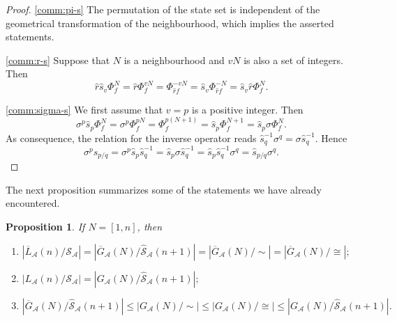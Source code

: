 \documentclass[a4paper]{article}
\newtheorem{prop}{Proposition}
\begin{document}
\begin{proof}

\ref{comm:pi-s}
The permutation of the state set is independent of the geometrical transformation of the neighbourhood, which
implies the asserted statements.

\ref{comm:r-s}
Suppose that $N$ is a neighbourhood and $vN$ is also a set of integers.
Then
\[
\hat{r} \hat{s}_v \Phi^N_f = \hat{r} \Phi^{vN}_f = \Phi^{-vN}_{\hat{r}f}
= \hat{s}_v \Phi^{-N}_{\hat{r} f} = \hat{s}_v \hat{r} \Phi^N_f.
\]

\ref{comm:sigma-s}
We first assume that $v=p$ is a positive integer.
Then
\[
\sigma^p \hat{s}_p \Phi^N_f = \sigma^p \Phi^{pN}_f = \Phi^{p(N+1)}_f = \hat{s}_p \Phi^{N+1}_f = \hat{s}_p \sigma \Phi^N_f.
\]
As consequence, the relation for the inverse operator reads $\hat{s}^{-1}_q \sigma^q = \sigma \hat{s}^{-1}_q$.
Hence
\[
\sigma^p \hat{s}_{p/q} = \sigma^p \hat{s}_p \hat{s}^{-1}_q = \hat{s}_p \sigma \hat{s}^{-1}_q
= \hat{s}_p \hat{s}^{-1}_q \sigma^q = \hat{s}_{p/q} \sigma^q.
\]
\end{proof}
The next proposition summarizes some of the statements we have already encountered.
\begin{prop}
If $N = [1,n]$, then
\begin{enumerate}[label=(\roman*)]
\item
$
|\overline{L}_\mathcal{A}(n)/\mathcal{S}_\mathcal{A}| = |\overline{G}_\mathcal{A}(N) / \hat{\mathcal{S}}_\mathcal{A}(n+1)|
= |\overline{G}_\mathcal{A}(N) / {\sim}| = |\overline{G}_\mathcal{A}(N) / {\cong}|;
$
\item
$
|L_\mathcal{A}(n)/\mathcal{S}_\mathcal{A}| = |G_\mathcal{A}(N) / \hat{\mathcal{S}}_\mathcal{A}(n+1)|;
$
\item
$
|\overline{G}_\mathcal{A}(N) / \hat{\mathcal{S}}_\mathcal{A}(n+1)| \le
|G_\mathcal{A}(N) / {\sim}| \le
|G_\mathcal{A}(N) / {\cong}| \le
|G_\mathcal{A}(N) / \hat{\mathcal{S}}_\mathcal{A}(n+1)|.
$
\end{enumerate}
\end{prop}
\end{document}
